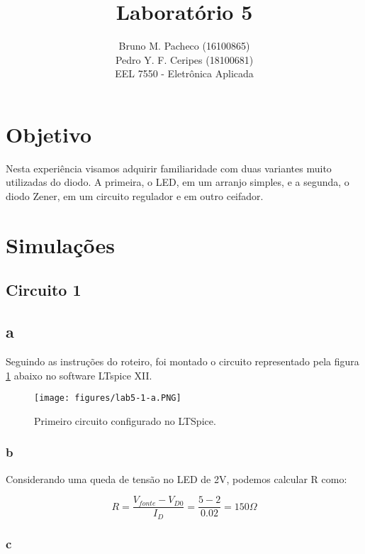 \documentclass[a4paper]{report}
\begin{document}
 
\title{Laboratório 5}
\author{Bruno M. Pacheco (16100865)\\
Pedro Y. F. Ceripes (18100681) \\
EEL 7550 - Eletrônica Aplicada}
 
\maketitle
\section*{Objetivo}
 
Nesta experiência visamos adquirir familiaridade com duas variantes muito utilizadas do diodo. A primeira, o LED, em um arranjo simples, e a segunda, o diodo Zener, em um circuito regulador e em outro ceifador.
 
\section*{Simulações}

\subsection*{Circuito 1}
\subsection*{a}

Seguindo as instruções do roteiro, foi montado o circuito representado pela figura \ref{fig:figures-lab5-1-a-png} abaixo no software LTspice XII.

\begin{figure}[H]
    \centering
    \texttt{[image: figures/lab5-1-a.PNG]}
    \caption{Primeiro circuito configurado no LTSpice.}
    \label{fig:figures-lab5-1-a-png}
\end{figure}

\subsubsection*{b}

Considerando uma queda de tensão no LED de 2V, podemos calcular R como:

\begin{equation*}
    R = \frac{V_{fonte}-V_{D0}}{I_D} = \frac{5-2}{0.02} = 150 \Omega
\end{equation*}

\subsubsection*{c}
\end{document}
